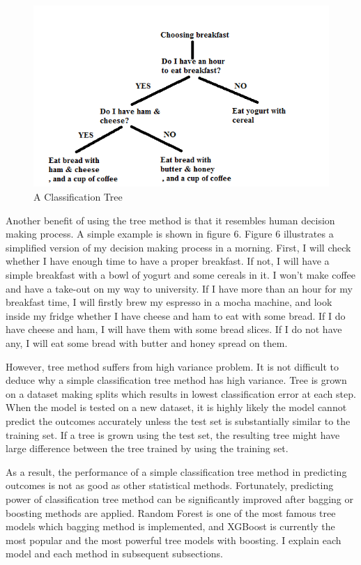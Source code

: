 \documentclass[11pt,a4paper,oneside]{article}
\begin{document}
\begin{figure}[!t]
    \centering
    \includegraphics[width=0.8\columnwidth]{Figures/cart2.png}
    \caption{A Classification Tree}
    \label{fig:5}
\end{figure}
\par
Another benefit of using the tree method is that it resembles human decision making process. A simple example is shown in figure 6. Figure 6 illustrates a simplified version of my decision making process in a morning. First, I will check whether I have enough time to have a proper breakfast. If not, I will have a simple breakfast with a bowl of yogurt and some cereals in it. I won't make coffee and have a take-out on my way to university. If I have more than an hour for my breakfast time, I will firstly brew my espresso in a mocha machine, and look inside my fridge whether I have cheese and ham to eat with some bread. If I do have cheese and ham, I will have them with some bread slices. If I do not have any, I will eat some bread with butter and honey spread on them.
\par
However, tree method suffers from high variance problem. It is not difficult to deduce why a simple classification tree method has high variance. Tree is grown on a dataset making splits which results in lowest classification error at each step. When the model is tested on a new dataset, it is highly likely the model cannot predict the outcomes accurately unless the test set is substantially similar to the training set. If a tree is grown using the test set, the resulting tree might have large difference between the tree trained by using the training set. 
\par
As a result, the performance of a simple classification tree method in predicting outcomes is not as good as other statistical methods. Fortunately, predicting power of classification tree method can be significantly improved after bagging or boosting methods are applied. Random Forest is one of the most famous tree models which bagging method is implemented, and XGBoost is currently the most popular and the most powerful tree models with boosting. I explain each model and each method in subsequent subsections.
\end{document}
